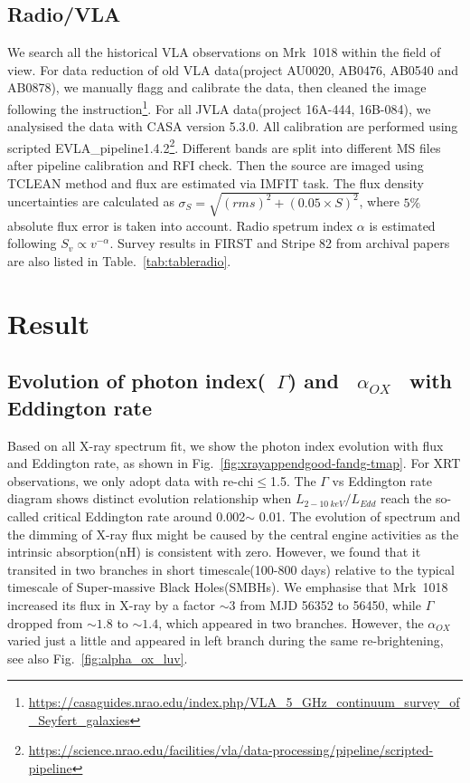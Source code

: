 \documentclass{aastex63}
\begin{document}
\subsection{Radio/VLA}
We search all the historical VLA observations on Mrk~1018 within the field of view. For data reduction of old VLA data(project AU0020, AB0476, AB0540 and AB0878), we manually flagg and calibrate the data, then cleaned the image following the instruction\footnote{\url{https://casaguides.nrao.edu/index.php/VLA_5_GHz_continuum_survey_of_Seyfert_galaxies}}. For all JVLA data(project 16A-444, 16B-084),  we analysised the data with CASA version 5.3.0\citep{2007ASPC..376..127M}. All calibration are performed using scripted EVLA\_pipeline1.4.2\footnote{\url{https://science.nrao.edu/facilities/vla/data-processing/pipeline/scripted-pipeline}}. Different bands are split into different MS files after pipeline calibration and RFI check. Then the source are imaged using TCLEAN method and flux are estimated via IMFIT task. The flux density uncertainties are calculated as $\sigma_{S}=\sqrt{(rms)^2+(0.05\times S)^2}$, where $5\%$ absolute flux error is taken into account. Radio spetrum index $\alpha$ is estimated following $S_v \propto v^{-\alpha}$. Survey results in FIRST\citep{1994ASPC...61..165B,1995ApJ...450..559B} and Stripe 82\citep{2011AJ....142....3H} from archival papers are also listed in Table.~\ref{tab:tableradio}.

\section{Result}
\label{sec:result}

\subsection{Evolution of photon index(~\texorpdfstring{$\Gamma$}.) and ~\texorpdfstring{$\alpha_{OX}$}.~ with Eddington rate \label{subsec:g-f}}

Based on all X-ray spectrum fit, we show the photon index evolution with flux and Eddington rate, as shown in Fig.~\ref{fig:xrayappendgood-fandg-tmap}. For XRT observations, we only adopt data with re-chi$\le$1.5. The $\Gamma$ vs Eddington rate diagram shows distinct evolution relationship when $L_{2-10~ keV}/L_{Edd}$ reach the so-called critical Eddington rate around 0.002$\sim$ 0.01. The evolution of spectrum and the dimming of X-ray flux might be caused by the central engine activities as the intrinsic absorption(nH) is consistent with zero. However, we found that it transited in two branches in short timescale(100-800 days) relative to the typical timescale of Super-massive Black Holes(SMBHs). We emphasise that Mrk~1018 increased its flux in X-ray by a factor $\sim3$ from MJD 56352 to 56450, while $\Gamma$ dropped from $\sim1.8$ to $\sim1.4$, which appeared in two branches. However, the $\alpha_{OX}$ varied just a little and appeared in left branch during the same re-brightening, see also Fig.~\ref{fig:alpha_ox_luv}.
\end{document}
